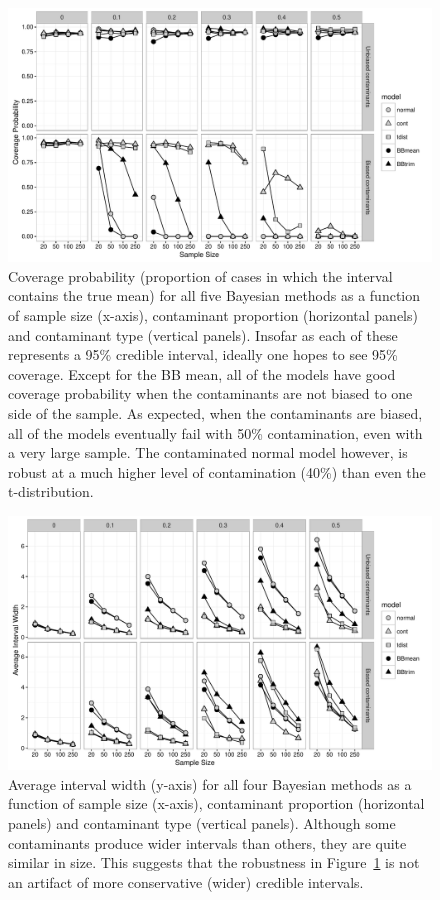 \documentclass[doc]{apa6}
\begin{document}
{\begin{figure}[p]
\centering
\includegraphics[width=14cm]{simCover.pdf}
\caption{Coverage probability (proportion of cases in which the interval contains the true mean) for all five Bayesian methods as a function of sample size (x-axis), contaminant proportion (horizontal panels) and contaminant type (vertical panels). Insofar as each of these represents a 95\% credible interval, ideally one hopes to see 95\% coverage. Except for the BB mean, all of the models have good coverage probability when the contaminants are not biased to one side of the sample. As expected, when the contaminants are biased, all of the models eventually fail with 50\% contamination, even with a very large sample. The contaminated normal model however, is robust at a much higher level of contamination (40\%)   than   even the t-distribution.    }
\label{simcover}
\end{figure}

\begin{figure}[p]
\centering
\includegraphics[width=14cm]{simWidth.pdf}
\caption{Average interval width (y-axis) for all four Bayesian methods as a function of sample size (x-axis), contaminant proportion (horizontal panels) and contaminant type (vertical panels). Although some contaminants produce wider intervals than others, they are quite similar in size. This suggests that the robustness in Figure~\ref{simcover} is not an artifact of more conservative (wider) credible intervals.}
\label{simwidth}
\end{figure}

}
\end{document}
